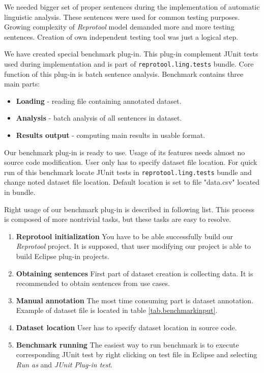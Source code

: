 We needed bigger set of proper sentences during the implementation of automatic linguistic analysis. These sentences were used for common testing purposes. Growing complexity of \emph{Reprotool} model demanded more and more testing sentences. Creation of own independent testing tool was just a logical step.

We have created special benchmark plug-in. This plug-in complement JUnit tests used during implementation and is part of {\tt reprotool.ling.tests} bundle. Core function of this plug-in is batch sentence analysis. Benchmark contains three main parts:

\begin{itemize}
\item {\bf Loading} - reading file containing annotated dataset.
\item {\bf Analysis} - batch analysis of all sentences in dataset.
\item {\bf Results output} - computing main results in usable format.
\end{itemize}

Our benchmark plug-in is ready to use. Usage of its features needs almost no source code modification. User only has to specify dataset file location. For quick run of this benchmark locate JUnit tests in {\tt reprotool.ling.tests} bundle and change noted dataset file location. Default location is set to file "data.csv" located in bundle.

Right usage of our benchmark plug-in is described in following list. This process is composed of more nontrivial tasks, but these tasks are easy to resolve.

\begin{enumerate}
\item {\bf Reprotool initialization} You have to be able successfully build our \emph{Reprotool} project. It is supposed, that user modifying our project is able to build Eclipse plug-in projects.
\item {\bf Obtaining sentences} First part of dataset creation is collecting data. It is recommended to obtain sentences from use cases.
\item {\bf Manual annotation} The most time consuming part is dataset annotation. Example of dataset file is located in table \ref{tab.benchmarkinput}.
\item {\bf Dataset location} User has to specify dataset location in source code.
\item {\bf Benchmark running} The easiest way to run benchmark is to execute corresponding JUnit test by right clicking on test file in Eclipse and selecting \emph{Run as} and \emph{JUnit Plug-in test}.
\end{enumerate}

